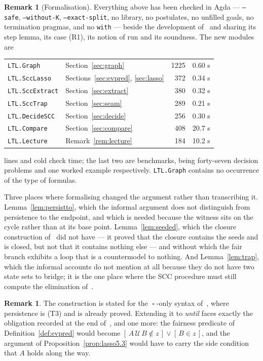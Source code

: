 \documentclass[11pt,a4paper]{article}
\theoremstyle{definition}
\newtheorem{remark}[theorem]{Remark}
\newcommand{\Always}{\mathop{\square}}
\begin{document}
\begin{remark}[Formalisation]
Everything above has been checked in Agda --- \texttt{--safe},
\texttt{--without-K}, \texttt{--exact-split}, no library, no postulates, no
unfilled goals, no termination pragmas, and no \texttt{with} --- beside the
development of~\cite{m4} and sharing its step lemma, its case (R1), its notion
of run and its soundness.  The new modules are
\begin{center}
\begin{tabular}{llrr}
\texttt{LTL.Graph}      & Section~\ref{sec:graph}     & 1225 & 0.60 s\\
\texttt{LTL.SccLasso}   & Sections~\ref{sec:evpred}, \ref{sec:lasso}
                                                      &  372 & 0.34 s\\
\texttt{LTL.SccExtract} & Section~\ref{sec:extract}   &  380 & 0.32 s\\
\texttt{LTL.SccTrap}    & Section~\ref{sec:seam}      &  289 & 0.21 s\\
\texttt{LTL.DecideSCC}  & Section~\ref{sec:decide}    &  256 & 0.30 s\\
\texttt{LTL.Compare}    & Section~\ref{sec:compare}   &  408 & 20.7 s\\
\texttt{LTL.Lecture}    & Remark~\ref{rem:lecture}    &  184 & 10.2 s\\
\end{tabular}
\end{center}
lines and cold check time; the last two are benchmarks, being forty-seven
decision problems and one worked example respectively.  \texttt{LTL.Graph}
contains no occurrence of the type of formulas.

Three places where formalising changed the argument rather than transcribing
it.  Lemma~\ref{lem:persistto}, which the informal argument does not
distinguish from persistence to the endpoint, and which is needed because the
witness sits on the cycle rather than at its base point.
Lemma~\ref{lem:seeded}, which the closure construction of~\cite{m4} did not
have --- it proved that the closure contains the seeds and is closed, but not
that it contains nothing else --- and without which the fair branch exhibits a
loop that is a countermodel to nothing.  And Lemma~\ref{lem:trap}, which the
informal accounts do not mention at all because they do not have two state
sets to bridge; it is the one place where the SCC procedure must still compute
the elimination of~\cite{m4}.
\end{remark}

\begin{remark}
The construction is stated for the $\Always$-only syntax of~\cite{m4}, where
persistence is (T3) and is already proved.  Extending it to \emph{until} faces
exactly the obligation recorded at the end of~\cite{m4}, and one more: the
fairness predicate of Definition~\ref{def:evpred} would become
$[\,A\,\mathcal{U}\,B\notin z\,]\vee[\,B\in z\,]$, and the argument of
Proposition~\ref{prop:lasso5.3} would have to carry the side condition that $A$
holds along the way.
\end{remark}
\end{document}
